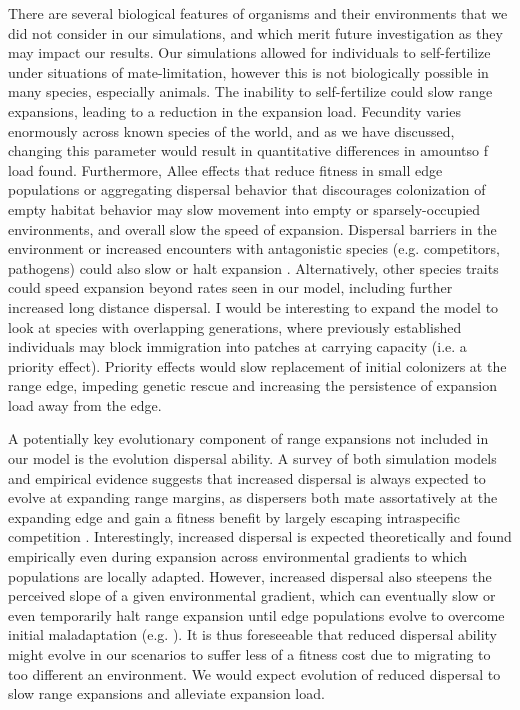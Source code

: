 There are several biological features of organisms and their environments that we did not consider in our simulations, and which merit future investigation as they may impact our results.  Our simulations allowed for individuals to self-fertilize under situations of mate-limitation, however this is not biologically possible in many species, especially animals. The inability to self-fertilize could slow range expansions, leading to a reduction in the expansion load. %
Fecundity varies enormously across known species of the world, and as we have discussed, changing this parameter would result in quantitative differences in amountso f load found. Furthermore, Allee effects that reduce fitness in small edge populations \citep{Taylor:2005} or aggregating dispersal behavior that discourages colonization of empty habitat behavior may slow movement into empty or sparsely-occupied environments, and overall slow the speed of expansion. Dispersal barriers in the environment or increased encounters with antagonistic species (e.g. competitors, pathogens) could also slow or halt expansion \citep{Case:2005}.  Alternatively, other species traits could speed expansion beyond rates seen in our model, including further increased long distance dispersal. I would be interesting to expand the model to look at species with overlapping generations, where previously established individuals may block immigration into patches at carrying capacity (i.e. a priority effect). Priority effects would slow replacement of initial colonizers at the range edge, impeding genetic rescue and increasing the persistence of expansion load away from the edge. 

A potentially key evolutionary component of range expansions not included in our model is the evolution dispersal ability.  A survey of both simulation models and empirical evidence suggests that increased dispersal is always expected to evolve at expanding range margins, as dispersers both mate assortatively at the expanding edge and gain a fitness benefit by largely escaping intraspecific competition \citep{Hargreaves:2014}. Interestingly, increased dispersal is expected theoretically and found empirically even during expansion across environmental gradients to which populations are locally adapted. However, increased dispersal also steepens the perceived slope of a given environmental gradient, which can eventually slow or even temporarily halt range expansion until edge populations evolve to overcome initial maladaptation (e.g. \citealt{Phillips:2012}). It is thus foreseeable that reduced dispersal ability might evolve in our scenarios to suffer less of a fitness cost due to migrating to too different an environment. We would expect evolution of reduced dispersal to slow range expansions and alleviate expansion load.




